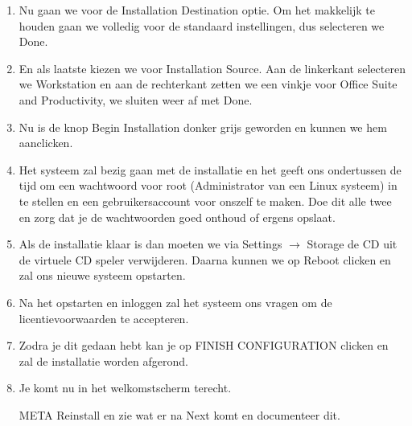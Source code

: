 \begin{enumerate}
	\item Nu gaan we voor de Installation Destination optie. Om het makkelijk te houden gaan we volledig voor de standaard instellingen, dus selecteren we Done.
	\item En als laatste kiezen we voor Installation Source. Aan de linkerkant selecteren we Workstation en aan de rechterkant zetten we een vinkje voor Office Suite and Productivity, we sluiten weer af met Done.
	\item Nu is de knop Begin Installation donker grijs geworden en kunnen we hem aanclicken.
	\item
		\begin{minipage}[t]{\linewidth}
		\raggedright
		Het systeem zal bezig gaan met de installatie en het geeft ons ondertussen de tijd om een wachtwoord voor root (Administrator van een Linux systeem) in te stellen en een gebruikersaccount voor onszelf te maken. Doe dit alle twee en zorg dat je de wachtwoorden goed onthoud of ergens opslaat.
		\end{minipage}
	\item Als de installatie klaar is dan moeten we via Settings $\rightarrow $ Storage de CD uit de virtuele CD speler verwijderen. Daarna kunnen we op Reboot clicken en zal ons nieuwe systeem opstarten.
	\item
		\begin{minipage}[t]{\linewidth}
		\raggedright
		Na het opstarten en inloggen zal het systeem ons vragen om de licentievoorwaarden te accepteren.
		\end{minipage}

	\item Zodra je dit gedaan hebt kan je op FINISH CONFIGURATION clicken en zal de installatie worden afgerond.
	\item
		\begin{minipage}[t]{\linewidth}
		\raggedright
		Je komt nu in het welkomstscherm terecht.
		\end{minipage}
	\item [META] Reinstall en zie wat er na Next komt en documenteer dit.
\end{enumerate}
